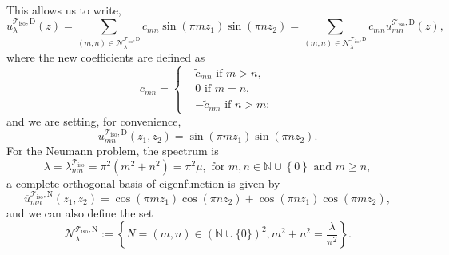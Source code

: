 \documentclass{amsart}
\theoremstyle{definition}
\theoremstyle{remark}
\renewcommand\geq\geqslant
\numberwithin{equation}{section}
\theoremstyle{definition}
\theoremstyle{remark}
\begin{document}
This allows us to write, \begin{equation}
	u_\lambda^{\mathcal{T}_\mathrm{iso},\mathrm{D}}(z)=\sum_{(m,n)\in	\mathcal{N}_\lambda^{\mathcal{T}_\mathrm{iso},\mathrm{D}}}c_{mn}\sin (\pi m z_1) \sin (\pi n z_2)=\sum_{(m,n)\in	\mathcal{N}_\lambda^{\mathcal{T}_\mathrm{iso},\mathrm{D}}}c_{mn}u_{mn}^{\mathcal{T}_\mathrm{iso},\mathrm{D}}(z),
\end{equation}where the new coefficients are defined as \begin{equation}\label{condD}
	c_{mn}=\left\{\begin{aligned}
		&\tilde{c}_{mn}\text{ if }m>n,
		\\& 0\text{ if }m=n,
		\\& -\tilde{c}_{nm}\text{ if }n>m;
	\end{aligned}\right.
\end{equation}
and we are setting, for convenience,
\begin{equation}
	u_{mn}^{\mathcal{T}_\mathrm{iso},\mathrm{D}}(z_1,z_2)=\sin (\pi m z_1) \sin (\pi n z_2).
\end{equation}
For the Neumann problem, the spectrum is \begin{equation}
	\lambda=	\lambda_{mn}^{\mathcal{T}_\mathrm{iso}}=\pi^2(m^2+n^2 )=\pi^2\mu,\text{ for } m, n \in \mathbb{N}\cup\left\{0\right\}\text{ and }m\geq n,
\end{equation} a complete orthogonal basis of eigenfunction is given by
\begin{equation}
	\overline{u}_{mn}^{\mathcal{T}_\mathrm{iso},\mathrm{N}}(z_1, z_2)=\cos (\pi m z_1) \cos (\pi n z_2)+\cos (\pi n z_1) \cos (\pi m z_2),
\end{equation}and we can also define the set
\begin{equation}
	\mathcal{N}_\lambda^{\mathcal{T}_\mathrm{iso},\mathrm{N}}:=\left\{N=(m,n)\in\left(\mathbb{N}\cup\{0\}\right)^2, m^2+n^2=\frac{\lambda}{\pi^2}\right\}.
\end{equation}
\end{document}
